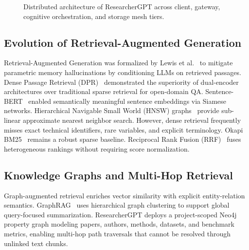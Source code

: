 \documentclass[conference]{IEEEtran}
\begin{document}
\begin{figure}[!t]
{}
\caption{Distributed architecture of ResearcherGPT across client, gateway, cognitive orchestration, and storage mesh tiers.}
\label{fig:architecture}
\end{figure}



\subsection{Evolution of Retrieval-Augmented Generation}
Retrieval-Augmented Generation was formalized by Lewis et al.~\cite{lewis2020rag} to mitigate parametric memory hallucinations by conditioning LLMs on retrieved passages. Dense Passage Retrieval (DPR)~\cite{karpukhin2020dpr} demonstrated the superiority of dual-encoder architectures over traditional sparse retrieval for open-domain QA. Sentence-BERT~\cite{reimers2019sbert} enabled semantically meaningful sentence embeddings via Siamese networks. Hierarchical Navigable Small World (HNSW) graphs~\cite{malkov2020hnsw} provide sub-linear approximate nearest neighbor search. However, dense retrieval frequently misses exact technical identifiers, rare variables, and explicit terminology. Okapi BM25~\cite{robertson2009bm25} remains a robust sparse baseline. Reciprocal Rank Fusion (RRF)~\cite{cormack2009rrf} fuses heterogeneous rankings without requiring score normalization.

\subsection{Knowledge Graphs and Multi-Hop Retrieval}
Graph-augmented retrieval enriches vector similarity with explicit entity-relation semantics. GraphRAG~\cite{edge2024graphrag} uses hierarchical graph clustering to support global query-focused summarization. ResearcherGPT deploys a project-scoped Neo4j property graph modeling papers, authors, methods, datasets, and benchmark metrics, enabling multi-hop path traversals that cannot be resolved through unlinked text chunks.
\end{document}
